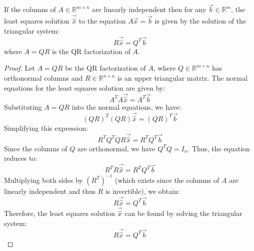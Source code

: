 \begin{theorem}
    If the columns of $A \in \mathbb{R}^{m \times n}$ are linearly independent then for any $\vec{b} \in \mathbb{R}^m$, the least squares solution $\vec{\hat{x}}$ to the equation $A \vec{x} = \vec{b}$ is given by the solution of the triangular system:
    \[
        R \vec{\hat{x}} = Q^T \vec{b}
    \]
    where $A = QR$ is the QR factorization of $A$.
\end{theorem}
\begin{proof}
    Let $A = QR$ be the QR factorization of $A$, where $Q \in \mathbb{R}^{m \times n}$ has orthonormal columns and $R \in \mathbb{R}^{n \times n}$ is an upper triangular matrix. The normal equations for the least squares solution are given by:
    \[
        A^T A \vec{\hat{x}} = A^T \vec{b}
    \]
    Substituting $A = QR$ into the normal equations, we have:
    \[
        (QR)^T (QR) \vec{\hat{x}} = (QR)^T \vec{b}
    \]
    Simplifying this expression:
    \[
        R^T Q^T Q R \vec{\hat{x}} = R^T Q^T \vec{b}
    \]
    Since the columns of $Q$ are orthonormal, we have $Q^T Q = I_n$. Thus, the equation reduces to:
    \[
        R^T R \vec{\hat{x}} = R^T Q^T \vec{b}
    \]
    Multiplying both sides by $(R^T)^{-1}$ (which exists since the columns of $A$ are linearly independent and thus $R$ is invertible), we obtain:
    \[
        R \vec{\hat{x}} = Q^T \vec{b}
    \]
    Therefore, the least squares solution $\vec{\hat{x}}$ can be found by solving the triangular system:
    \[
        R \vec{\hat{x}} = Q^T \vec{b}
    \]
\end{proof}

